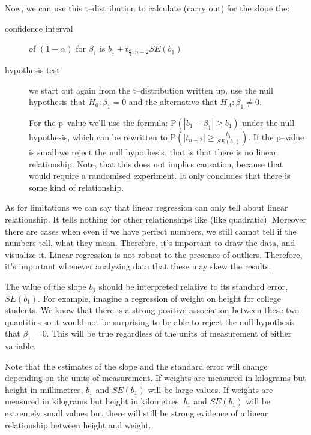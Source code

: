 Now, we can use this t--distribution to calculate (carry out) for the slope the:

\begin{description}
	\item[confidence interval] of $(1-\alpha)$ for $\beta_1$ is $b_1 \pm
		      t_{\frac{\alpha}{2}, n-2} SE(b_1)$
	\item[hypothesis test] we start out again from
	      the t--distribution written up, use the null hypothesis that $H_0: \beta_1 = 0$
	      and the alternative that $H_A: \beta_1 \neq 0$.

	      For the p--value we'll use the formula: P$(|b_1-\beta_1| \geq b_1)$ under the
	      null hypothesis, which can be rewritten to P$\left(|t_{n-2}| \geq
		      \frac{b_1}{SE(b_1)}\right)$. If the p--value is small we reject the null
	      hypothesis, that is that there is no linear relationship. Note, that this does
	      not implies causation, because that would require a randomised experiment. It
	      only concludes that there is some kind of relationship.
\end{description}

As for limitations we can say that linear regression can only tell about linear
relationship. It tells nothing for other relationships like (like quadratic).
Moreover there are cases when even if we have perfect numbers, we  still cannot
tell if the numbers tell, what they mean. Therefore, it's important to draw the
data, and visualize it. Linear regression is not robust to the presence of
outliers. Therefore, it's important whenever analyzing data that these may skew
the results.

The value of the slope $b_1$ should be interpreted relative to its standard
error, $SE(b_1)$. For example, imagine a regression of weight on height for
college students. We know that there is a strong positive association between these two
quantities so it would not be surprising to be able to reject the null
hypothesis that $\beta_1=0$. This will be true regardless of the units of
measurement of either variable.

Note that the estimates of the slope and the standard error will change
depending on the units of measurement. If weights are measured in kilograms but
height in millimetres, $b_1$ and $SE(b_1)$ will be large values. If weights are
measured in kilograms but height in kilometres, $b_1$ and $SE(b_1)$ will be
extremely small values but there will still be strong evidence of a linear
relationship between height and weight.

